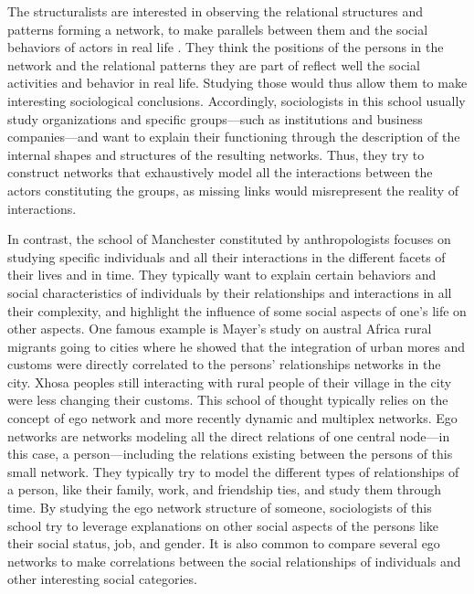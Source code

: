 The structuralists are interested in observing the relational structures and patterns forming a network, to make parallels between them and the social behaviors of actors in real life \cite{lazegaReseaux}.
They think the positions of the persons in the network and the relational patterns they are part of reflect well the social activities and behavior in real life.
Studying those would thus allow them to make interesting sociological conclusions.
Accordingly, sociologists in this school usually study organizations and specific groups---such as institutions and business companies---and want to explain their functioning through the description of the internal shapes and structures of the resulting networks.
Thus, they try to construct networks that exhaustively model all the interactions between the actors constituting the groups, as missing links would misrepresent the reality of interactions.

In contrast, the school of Manchester constituted by anthropologists focuses on studying specific individuals and all their interactions in the different facets of their lives and in time.
They typically want to explain certain behaviors and social characteristics of individuals by their relationships and interactions in all their complexity,
and highlight the influence of some social aspects of one's life on other aspects.
One famous example is Mayer's study on austral Africa rural migrants going to cities \cite{mayerMigrancyStudyAfricans1962} where he showed that the integration of urban mores and customs were directly correlated to the persons' relationships networks in the city.
Xhosa peoples still interacting with rural people of their village in the city were less changing their customs.
This school of thought typically relies on the concept of ego network and more recently dynamic and multiplex networks.
Ego networks are networks modeling all the direct relations of one central node---in this case, a person---including the relations existing between the persons of this small network.
They typically try to model the different types of relationships of a person, like their family, work, and friendship ties, and study them through time.
By studying the ego network structure of someone, sociologists of this school try to leverage explanations on other social aspects of the persons like their social status, job, and gender.
It is also common to compare several ego networks to make correlations between the social relationships of individuals and other interesting social categories.

